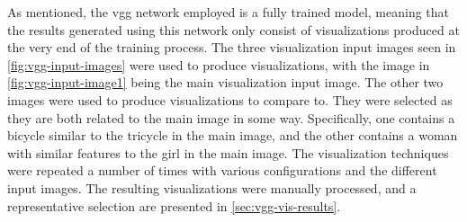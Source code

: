 \noindent As mentioned, the \acrshort{vgg} network employed is a fully trained model, meaning that the results generated using this network only consist of visualizations produced at the very end of the training process. The three visualization input images seen in \autoref{fig:vgg-input-images} were used to produce visualizations, with the image in \autoref{fig:vgg-input-image1} being the main visualization input image. The other two images were used to produce visualizations to compare to. They were selected as they are both related to the main image in some way. Specifically, one contains a bicycle similar to the tricycle in the main image, and the other contains a woman with similar features to the girl in the main image. The visualization techniques were repeated a number of times with various configurations and the different input images. The resulting visualizations were manually processed, and a representative selection are presented in \autoref{sec:vgg-vis-results}.

